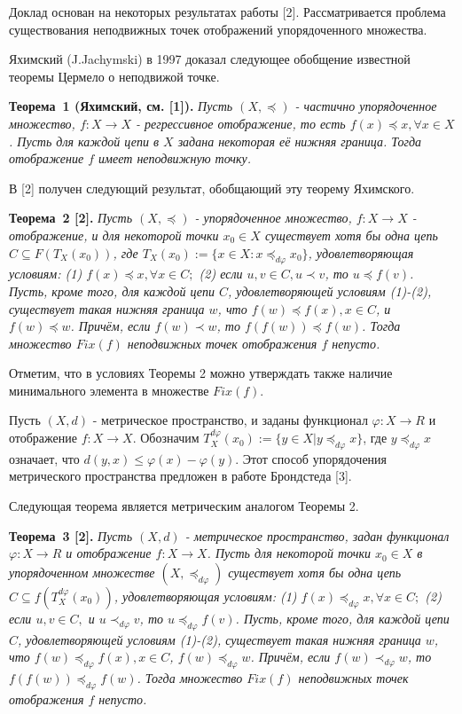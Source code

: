 \vzmscaption

Доклад основан на некоторых результатах работы [2]. Рассматривается проблема существования неподвижных точек отображений упорядоченного  множества.

Яхимский (J.Jachymski) в 1997 доказал следующее обобщение известной теоремы Цермело о неподвижой точке.

\textbf{Теорема~1 (Яхимский, см. [1]).}  {\it Пусть  $(X,\preceq)$  - частично упорядоченное множество,  $f: X\to X$ - регрессивное отображение, то есть $f(x)\preceq x, \forall x\in X$. Пусть для каждой цепи в $X$  задана некоторая её нижняя граница. Тогда отображение $f$ имеет неподвижную точку.}

В [2] получен следующий результат, обобщающий эту теорему Яхимского.

\textbf{Теорема~2 [2].} {\it Пусть $(X,\preceq)$ - упорядоченное множество, $f: X\to X$ - отображение, и для некоторой точки $x_{0}\in X$ существует хотя бы одна цепь $C\subseteq F(T_{X}(x_{0}))$, где $T_{X}(x_{0}):=\{x\in X : x\preceq_{d\varphi}x_{0}\}$, удовлетворяющая условиям: (1) $ f(x)\preceq x,\forall x\in C;$ (2) если $u,v\in C, u\prec v$, то $u\preceq f(v)$. Пусть, кроме того, для каждой цепи $C$, удовлетворяющей условиям (1)-(2), существует такая нижняя граница $w$, что $f(w)\preceq f(x), x\in C$, и $f(w)\preceq w$. Причём, если $f(w)\prec w$, то $f(f(w))\preceq f(w)$. Тогда множество $Fix(f)$ неподвижных точек отображения $f$ непусто.}

Отметим, что в условиях Теоремы 2 можно утверждать также наличие минимального элемента в множестве $Fix(f)$.


Пусть $(X,d)$ - метрическое пространство, и заданы функционал $\varphi: X\to R$ и отображение $f: X\to X$. Обозначим $T_{X}^{d\varphi}(x_{0}):=\{y\in X | y\preceq_{d \varphi}x\}$, где $y\preceq_{d \varphi}x$ означает, что $d(y,x)\le \varphi(x)-\varphi(y)$. Этот способ упорядочения метрического пространства предложен в работе Брондстеда [3].

Следующая теорема является метрическим аналогом Теоремы 2.

\textbf{Теорема~3 [2].} {\it  Пусть $(X,d)$ - метрическое пространство, задан  функционал $\varphi :X\to R$ и  отображение $f: X\to X$. Пусть для некоторой точки $x_{0}\in X$ в упорядоченном множестве $(X, \preceq_{d \varphi})$ существует хотя бы одна цепь $C\subseteq f(T_{X}^{d \varphi}(x_{0}))$, удовлетворяющая условиям: (1) $f(x)\preceq_{d \varphi} x, \forall x\in C;$ (2) если $u,v\in C,$ и $u\prec_{d \varphi} v$, то $u\preceq_{d \varphi} f(v)$. Пусть, кроме того, для каждой цепи $C$, удовлетворяющей условиям (1)-(2), существует такая нижняя граница $w$, что $f(w)\preceq_{d \varphi} f(x), x\in C$, $f(w)\preceq_{d \varphi} w$. Причём, если $f(w)\prec_{d \varphi} w$, то $f(f(w))\preceq_{d \varphi} f(w)$. Тогда множество $Fix(f)$ неподвижных точек отображения $f$ непусто.}

